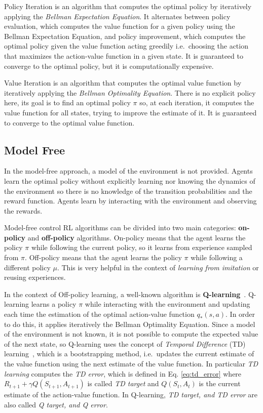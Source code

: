 Policy Iteration is an algorithm that computes the optimal policy by iteratively applying the \textit{Bellman Expectation Equation}.
It alternates between policy evaluation, which computes the value function for a given policy using the Bellman Expectation Equation, and policy improvement, which computes the optimal policy given the value function acting greedily i.e.\ choosing the action that maximizes the action-value function in a given state.
It is guaranteed to converge to the optimal policy, but it is computationally expensive.

Value Iteration is an algorithm that computes the optimal value function by iteratively applying the \textit{Bellman Optimality Equation}.
There is no explicit policy here, its goal is to find an optimal policy $\pi$ so, at each iteration, it computes the value function for all states, trying to improve the estimate of it.
It is guaranteed to converge to the optimal value function.


\subsection{Model Free}
\label{subsec:model_free_rl}
In the model-free approach, a model of the environment is not provided.
Agents learn the optimal policy without explicitly learning nor knowing the dynamics of the environment so there is no knowledge of the transition probabilities and the reward function.
Agents learn by interacting with the environment and observing the rewards.


Model-free control RL algorithms can be divided into two main categories: \textbf{on-policy} and \textbf{off-policy} algorithms.
On-policy means that the agent learns the policy $\pi$ while following the current policy, so it learns from experience sampled from $\pi$.
Off-policy means that the agent learns the policy $\pi$ while following a different policy $\mu$.
This is very helpful in the context of \textit{learning from imitation} or reusing experiences.

In the context of Off-policy learning, a well-known algorithm is \textbf{Q-learning}~\citep{watkins1992q}.
Q-learning learns a policy $\pi$ while interacting with the environment and updating each time the estimation of the optimal action-value function $q_*(s,a)$.
In order to do this, it applies iteratively the Bellman Optimality Equation.
Since a model of the environment is not known, it is not possible to compute the expected value of the next state, so Q-learning uses the concept of \textit{Temporal Difference} (TD) learning~\citep{sutton1988learning}, which is a bootstrapping method, i.e.\ updates the current estimate of the value function using the next estimate of the value function.
In particular \textit{TD learning} computes the \textit{TD error}, which is defined in Eq. \ref{eq:td_error} where  $R_{t+1} + \gamma Q(S_{t+1}, A_{t+1})$ is called \textit{TD target} and $Q(S_t, A_t)$ is the current estimate of the action-value function.
In Q-learning, \textit{TD target, and TD error} are also called \textit{Q target, and Q error}.

